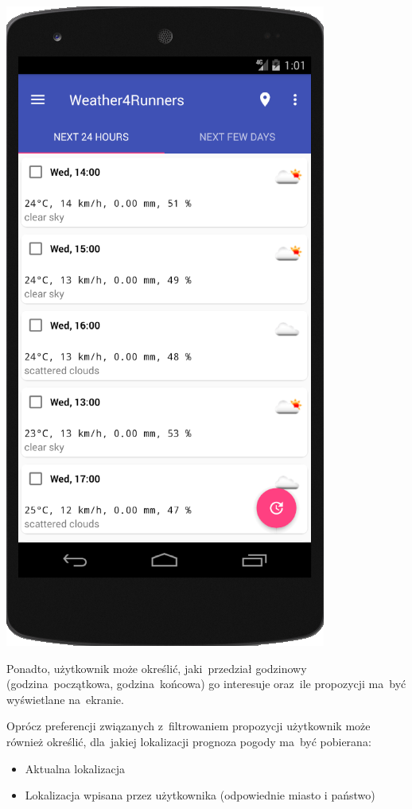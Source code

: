 \documentclass[11pt, a4paper, oneside]{scrartcl}
\begin{document}
\includegraphics[scale=0.7]{screen_props.png}

Ponadto, użytkownik może określić, jaki~przedział godzinowy (godzina~początkowa, godzina~końcowa) go interesuje oraz~ile propozycji ma~być wyświetlane
na~ekranie.

Oprócz preferencji związanych z~filtrowaniem propozycji użytkownik może również określić, dla~jakiej lokalizacji prognoza pogody ma~być pobierana:

\begin{itemize}
	\item Aktualna lokalizacja
	\item Lokalizacja wpisana przez użytkownika (odpowiednie miasto i państwo)
\end{itemize}
\end{document}
